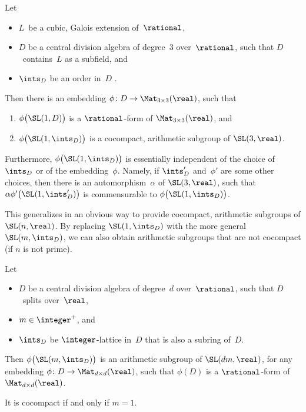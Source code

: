 \begin{prop} \label{DCocpctinSL3R}
 Let
 \begin{itemize}
 \item $L$~be a cubic, Galois extension of\/~$\rational$,
 \item $D$ be a central division algebra of degree\/~$3$
over\/~$\rational$, such that $D$~contains~$L$ as a subfield,
and
 \item $\ints_D$ be an order in~$D$ .
 \end{itemize}
 Then there is an embedding $\phi \colon D \to \Mat_{3
\times 3}(\real)$, such that 
 \begin{enumerate}
 \item $\phi \bigl( \SL(1,D) \bigr)$ is a\/ $\rational$-form
of\/ $\Mat_{3 \times 3}(\real)$, and
 \item \label{DCocpctinSL3R-cocpct}
 $\phi \bigl( \SL(1,\ints_D) \bigr)$ is a cocompact,
arithmetic subgroup of\/ $\SL(3,\real)$.
 \end{enumerate}

Furthermore, $\phi \bigl( \SL(1,\ints_D) \bigr)$ is
essentially independent of the choice of~$\ints_D$ or
of the embedding~$\phi$. Namely, if $\ints_D'$
and~$\phi'$ are some other choices, then there is an
automorphism~$\alpha$ of\/ $\SL(3,\real)$, such that
$\alpha \phi' \bigl( \SL(1,\ints_D') \bigr)$ is
commensurable to $\phi \bigl( \SL(1,\ints_D)
\bigr)$.
 \end{prop}

This generalizes in an obvious
way to provide cocompact, arithmetic subgroups of
$\SL(n,\real)$. By replacing $\SL(1,\ints_D)$ with the
more general $\SL(m,\ints_D)$, we can also obtain arithmetic subgroups
that are not cocompact (if $n$ is not prime).

\begin{prop} \label{LattSLnRDivAlg}
 Let
 \noprelistbreak
 \begin{itemize}
 \item $D$ be a central division algebra of degree~$d$
over\/~$\rational$, such that $D$~splits over\/~$\real$,
 \item $m \in \integer^+$, and
 \item $\ints_D$ be $\integer$-lattice in~$D$ that is
also a subring of~$D$.
 \end{itemize}
 Then $\phi \bigl( \SL(m,\ints_D) \bigr)$ is an
arithmetic subgroup of\/ $\SL(dm,\real)$, for any embedding
$\phi \colon D \to \Mat_{d \times d}(\real)$, such that
$\phi(D)$ is a\/ $\rational$-form of\/ $\Mat_{d \times
d}(\real)$.

It is cocompact if and only if $m = 1$.
 \end{prop}



